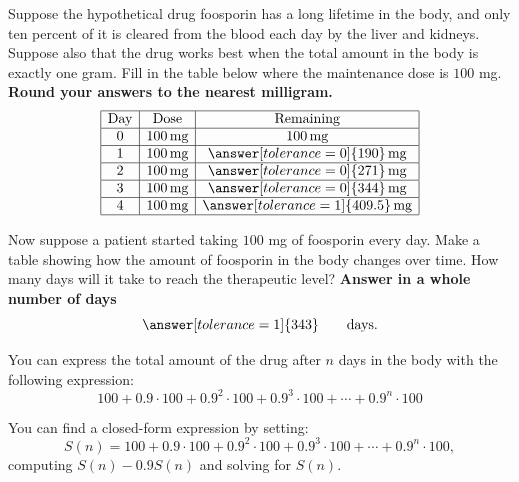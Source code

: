 \documentclass{ximera}
\begin{document}
\newpage
\begin{question}
  Suppose the hypothetical drug foosporin has a long lifetime in the
  body, and only ten percent of it is cleared from the blood each day
  by the liver and kidneys. Suppose also that the drug works best when
  the total amount in the body is exactly one gram. Fill in the table
  below where the maintenance dose is $100$ mg. \textbf{Round your answers to the
  nearest milligram.}
  \[
  \begin{array}{|c|c|c|}
    \hline
    \text{Day} & \text{Dose} & \text{Remaining} \\ \hline
    0  & 100\,\text{mg} & 100\,\text{mg} \\ \hline
    1  & 100\,\text{mg} & \answer[tolerance=0]{190}\,\text{mg}\\ \hline
    2  & 100\,\text{mg} & \answer[tolerance=0]{271}\,\text{mg}\\ \hline
    3  & 100\,\text{mg} & \answer[tolerance=0]{344}\,\text{mg}\\ \hline
    4  & 100\,\text{mg} & \answer[tolerance=1]{409.5}\,\text{mg}\\ \hline
  \end{array}
  \]
\end{question}

\begin{question}
Now suppose a patient started taking $100$ mg of foosporin every day.
Make a table showing how the amount of foosporin in the body changes
over time.  How many days will it take to reach the therapeutic level?
\textbf{Answer in a whole number of days}
\[
\answer[tolerance=1]{343}\qquad\text{days.}
\]
\begin{hint}
  You can express the total amount of the drug after $n$ days in the
  body with the following expression:
  \[
  100 + 0.9\cdot 100 + 0.9^2 \cdot 100 + 0.9^3 \cdot 100 +\cdots + 0.9^n \cdot 100
  \]
\end{hint}
\begin{hint}
  You can find a closed-form expression by setting:
  \[
  S(n)= 100 + 0.9\cdot 100 + 0.9^2 \cdot 100 + 0.9^3 \cdot 100 +\cdots + 0.9^n \cdot 100,
  \]
  computing $S(n) - 0.9 S(n)$ and solving for $S(n)$.
\end{hint}
\end{question}
\end{document}
